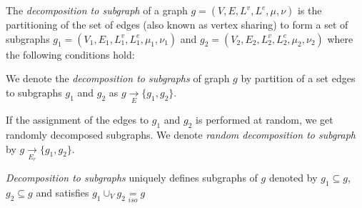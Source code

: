 \begin{definition}
\label{def:def39}
The \textit{decomposition to subgraph} of a graph $g=(V,E,L^{v} ,L^{e} ,\mu,\nu)$ is the partitioning of the set of edges (also known as vertex sharing) to form a set of subgraphs $g_1=(V_1,E_1,L_1^{v} ,L_1^{e} ,\mu_1,\nu_1)$ and $g_2=(V_2,E_2,L_2^{v} ,L_2^{e} , \mu_2, \nu_2)$ where the following conditions hold:


We denote the \textit{decomposition to subgraphs} of graph $g$ by partition of a set edges to subgraphs $g_1$ and $g_2$ as $g  \underset{E}{\rightarrow} \{ g_1 , g_2 \}$.
 
If the assignment of the edges to $g_1$ and $g_2$ is performed at random, we get randomly decomposed subgraphs. We denote \textit{random decomposition to subgraph}  by $g  \underset{E_r }{\rightarrow} \{ g_1 , g_2 \}$.

\textit{Decomposition to subgraphs} uniquely defines subgraphs of $g$ denoted by  $g_1 \subseteq g$, $g_2 \subseteq g$ and satisfies $g_{1} \cup_{V} g_{2} \underset{iso}{=} g $
\end{definition}


